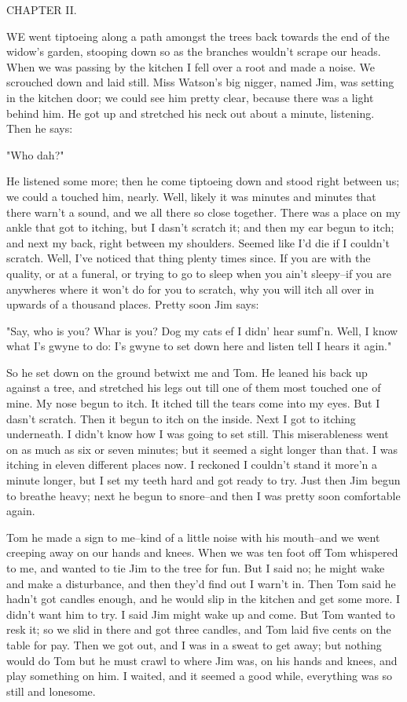 CHAPTER II.

WE went tiptoeing along a path amongst the trees back towards the end of
the widow's garden, stooping down so as the branches wouldn't scrape our
heads. When we was passing by the kitchen I fell over a root and made a
noise.  We scrouched down and laid still.  Miss Watson's big nigger,
named Jim, was setting in the kitchen door; we could see him pretty
clear, because there was a light behind him.  He got up and stretched his
neck out about a minute, listening.  Then he says:

"Who dah?"

He listened some more; then he come tiptoeing down and stood right
between us; we could a touched him, nearly.  Well, likely it was minutes
and minutes that there warn't a sound, and we all there so close
together.  There was a place on my ankle that got to itching, but I
dasn't scratch it; and then my ear begun to itch; and next my back, right
between my shoulders.  Seemed like I'd die if I couldn't scratch.  Well,
I've noticed that thing plenty times since.  If you are with the quality,
or at a funeral, or trying to go to sleep when you ain't sleepy--if you
are anywheres where it won't do for you to scratch, why you will itch all
over in upwards of a thousand places. Pretty soon Jim says:

"Say, who is you?  Whar is you?  Dog my cats ef I didn' hear sumf'n.
Well, I know what I's gwyne to do:  I's gwyne to set down here and listen
tell I hears it agin."

So he set down on the ground betwixt me and Tom.  He leaned his back up
against a tree, and stretched his legs out till one of them most touched
one of mine.  My nose begun to itch.  It itched till the tears come into
my eyes.  But I dasn't scratch.  Then it begun to itch on the inside.
Next I got to itching underneath.  I didn't know how I was going to set
still. This miserableness went on as much as six or seven minutes; but it
seemed a sight longer than that.  I was itching in eleven different
places now.  I reckoned I couldn't stand it more'n a minute longer, but I
set my teeth hard and got ready to try.  Just then Jim begun to breathe
heavy; next he begun to snore--and then I was pretty soon comfortable
again.

Tom he made a sign to me--kind of a little noise with his mouth--and we
went creeping away on our hands and knees.  When we was ten foot off Tom
whispered to me, and wanted to tie Jim to the tree for fun.  But I said
no; he might wake and make a disturbance, and then they'd find out I
warn't in. Then Tom said he hadn't got candles enough, and he would slip
in the kitchen and get some more.  I didn't want him to try.  I said Jim
might wake up and come.  But Tom wanted to resk it; so we slid in there
and got three candles, and Tom laid five cents on the table for pay.
Then we got out, and I was in a sweat to get away; but nothing would do
Tom but he must crawl to where Jim was, on his hands and knees, and play
something on him.  I waited, and it seemed a good while, everything was
so still and lonesome.

